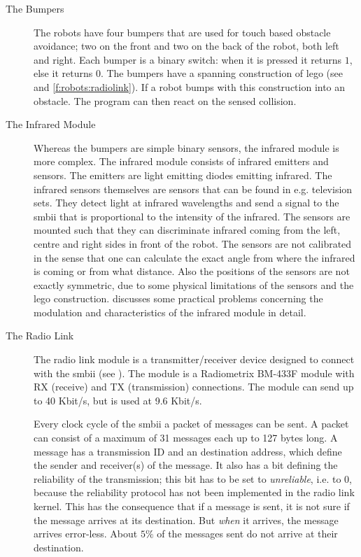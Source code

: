\begin{description}
\item[The Bumpers] The robots have four bumpers that are used for touch based obstacle avoidance; two on the front and two on the back of the robot, both left and right. Each bumper is a binary switch: when it is pressed it returns $1$, else it returns $0$. The bumpers have a spanning construction of {\sc lego} (see  and \ref{f:robots:radiolink}). If a robot bumps with this construction into an obstacle. The program can then react on the sensed collision.
\item[The Infrared Module] Whereas the bumpers are simple binary sensors, the infrared module  is more complex. The infrared module consists of infrared emitters and sensors. The emitters are light emitting diodes emitting infrared. The infrared sensors themselves are sensors that can be found in e.g. television sets. They detect light at infrared wavelengths and send a signal to the {\sc smbii} that is proportional to the intensity of the infrared. The sensors are mounted such that they can discriminate infrared coming from the left, centre and right sides in front of the robot. The sensors are not calibrated in the sense that one can calculate the exact angle from where the infrared is coming or from what distance. Also the  positions of the sensors are not exactly symmetric, due to some physical limitations of the sensors and the {\sc lego} construction. \citet{vogt:1997} discusses some practical problems concerning the modulation and characteristics of the infrared module in detail.


\item[The Radio Link] The radio link module is a transmitter/receiver device designed to connect with the {\sc smbii} (see ). The module is a Radiometrix BM-433F module with RX (receive) and TX (transmission) connections. The module can send up to 40 Kbit/s, but is used at 9.6 Kbit/s. 

Every clock cycle of the {\sc smbii} a packet of messages can be sent. A packet can consist of a maximum of 31 messages each up to 127 bytes long. A message has a transmission ID and an destination address, which define the sender and receiver(s) of the message.  It also has a bit defining the reliability of the transmission; this bit has to be set to {\it unreliable}, i.e. to $0$, because the reliability protocol has not been implemented in the radio link kernel. This has the consequence that if a message is sent, it is not sure if the message arrives at its destination. But {\em when} it arrives, the message arrives error-less. About $5\%$ of the messages sent do not arrive at their destination.


\end{description}
